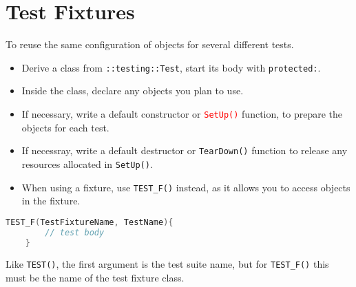 \documentclass[letterpaper,11pt]{report}
\begin{document}
\section*{Test Fixtures}
To reuse the same configuration of objects for several different tests.
\begin{itemize}
    \item Derive a class from \texttt{::testing::Test}, start its body with \texttt{protected:}.
    \item Inside the class, declare any objects you plan to use.
    \item If necessary, write a default constructor or \textcolor{red}{\texttt{SetUp()}} function, to prepare the objects for each test.
    \item If necessray, write a default destructor or \texttt{TearDown()} function to release any resources allocated in \texttt{SetUp()}.
    \item When using a fixture, use \texttt{TEST\_F()} instead, as it allows you to access objects in the fixture.  
\end{itemize}

\begin{lstlisting}[language=C++]
    TEST_F(TestFixtureName, TestName){
        // test body
    }
\end{lstlisting}

Like \texttt{TEST()}, the first argument is the test suite name, but for \texttt{TEST\_F()} this must be the
name of the test fixture class.
\end{document}
